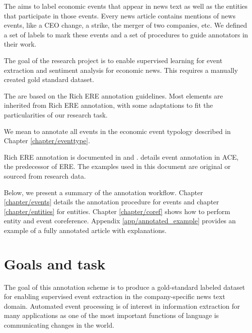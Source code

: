 The \scheme aims to label economic events that appear in news text as well as the entities that participate in those events.
Every news article contains mentions of news events, like a CEO change, a strike, the merger of two companies, etc.
We defined a set of labels to mark these events and a set of procedures to guide annotators in their work.

The goal of the \project research project is to enable supervised learning for event extraction and sentiment analysis for economic news. This requires a manually created gold standard dataset.

The \scheme are based on the Rich ERE annotation guidelines.
Most elements are inherited from Rich ERE annotation, with some adaptations to fit the particularities of our research task.

We mean to annotate all events in the economic event typology described in Chapter \ref{chapter/eventtype}.

Rich ERE annotation is documented in \cite{LDC2016.rich_ere} and \cite{Song2015}. \cite{Consortium2008a} details event annotation in ACE, the predecessor of ERE.
The examples used in this document are original or sourced from research data.


Below, we present a summary of the annotation workflow. Chapter \ref{chapter/events} details the annotation procedure for events and chapter \ref{chapter/entities} for entities. Chapter \ref{chapter/coref} shows how to perform entity and event coreference. Appendix \ref{app/annotated_example} provides an example of a fully annotated article with explanations.

\section{\project Goals and task}
The goal of this annotation scheme is to produce a gold-standard labeled dataset for enabling supervised event extraction in the company-specific news text domain. Automated event processing is of interest in information extraction for many applications as one of the most important functions of language is communicating changes in the world.

